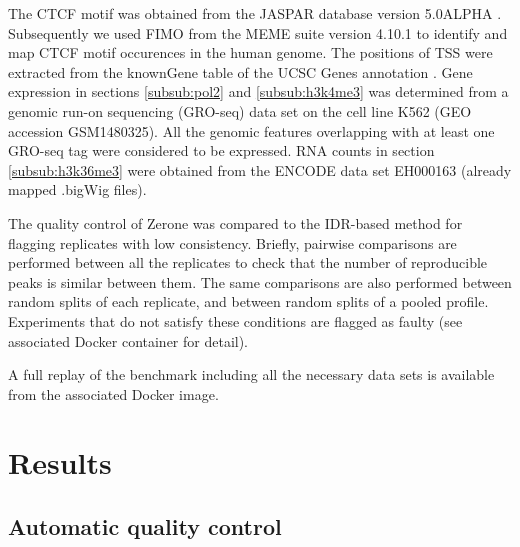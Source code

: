 \documentclass{bioinfo}
\begin{document}
\begin{methods}
The CTCF motif was obtained from the JASPAR database version
5.0{\textunderscore}ALPHA \citep[motif ID MA0139.1,][]{pmid24194598}.
Subsequently we used FIMO \citep{pmid21330290} from the MEME suite version
4.10.1 \citep{pmid19458158} to identify and map CTCF motif occurences in
the human genome. The positions of TSS were extracted from the knownGene
table of the UCSC Genes annotation \citep{Karolchik2004}.
Gene expression in sections \ref{subsub:pol2} and \ref{subsub:h3k4me3}
was determined from a genomic run-on sequencing (GRO-seq)
data set on the cell line K562 (GEO accession GSM1480325).
All the genomic features overlapping with at least one GRO-seq tag
were considered to be expressed.
RNA counts in section \ref{subsub:h3k36me3} were obtained from the
ENCODE data set EH000163 (already mapped .bigWig files).

The quality control of Zerone was compared to the IDR-based method
for flagging replicates with low consistency. Briefly, pairwise
comparisons are performed between all the replicates to check that
the number of reproducible peaks is similar between them. The
same comparisons are also performed between random splits of each
replicate, and between random splits of a pooled profile. Experiments
that do not satisfy these conditions are flagged as faulty (see
associated Docker container for detail).

A full replay of the benchmark including all the necessary data sets
is available from the associated Docker image.

\end{methods}

\section{Results}
\label{sec:results}

\subsection{Automatic quality control}
\end{document}
